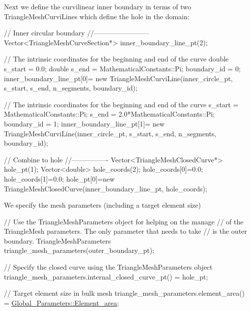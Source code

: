 Next we define the curvilinear inner boundary in terms of two {\ttfamily Triangle\+Mesh\+Curvi\+Lines} which define the hole in the domain\+:


\begin{DoxyCodeInclude}

 \textcolor{comment}{// Inner circular boundary}
 \textcolor{comment}{//------------------------}
 Vector<TriangleMeshCurveSection*> inner\_boundary\_line\_pt(2);
 
 \textcolor{comment}{// The intrinsic coordinates for the beginning and end of the curve}
 \textcolor{keywordtype}{double} s\_start = 0.0;
 \textcolor{keywordtype}{double} s\_end   = MathematicalConstants::Pi;
 boundary\_id = 0;
 inner\_boundary\_line\_pt[0]=
  \textcolor{keyword}{new} TriangleMeshCurviLine(inner\_circle\_pt,
                            s\_start,
                            s\_end,
                            n\_segments,
                            boundary\_id);
 
 \textcolor{comment}{// The intrinsic coordinates for the beginning and end of the curve}
 s\_start = MathematicalConstants::Pi;
 s\_end   = 2.0*MathematicalConstants::Pi;
 boundary\_id = 1;
 inner\_boundary\_line\_pt[1]=
  \textcolor{keyword}{new} TriangleMeshCurviLine(inner\_circle\_pt,
                            s\_start,
                            s\_end,
                            n\_segments,
                            boundary\_id);
 

 \textcolor{comment}{// Combine to hole}
 \textcolor{comment}{//----------------}
 Vector<TriangleMeshClosedCurve*> hole\_pt(1);
 Vector<double> hole\_coords(2);
 hole\_coords[0]=0.0;
 hole\_coords[1]=0.0;
 hole\_pt[0]=\textcolor{keyword}{new} TriangleMeshClosedCurve(inner\_boundary\_line\_pt,
                                        hole\_coords);

\end{DoxyCodeInclude}


We specify the mesh parameters (including a target element size)


\begin{DoxyCodeInclude}
 
 
 \textcolor{comment}{// Use the TriangleMeshParameters object for helping on the manage }
 \textcolor{comment}{// of the TriangleMesh parameters. The only parameter that needs to take }
 \textcolor{comment}{// is the outer boundary.}
 TriangleMeshParameters triangle\_mesh\_parameters(outer\_boundary\_pt);

 \textcolor{comment}{// Specify the closed curve using the TriangleMeshParameters object}
 triangle\_mesh\_parameters.internal\_closed\_curve\_pt() = hole\_pt;

 \textcolor{comment}{// Target element size in bulk mesh}
 triangle\_mesh\_parameters.element\_area() = \hyperlink{namespaceGlobal__Parameters_af365b0769e142cabdaed848057332858}{Global\_Parameters::Element\_area}; 

\end{DoxyCodeInclude}


